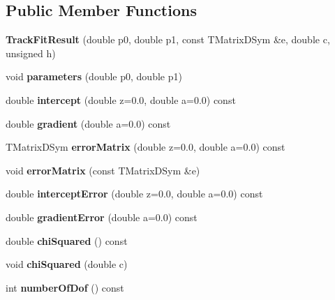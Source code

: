 \subsection*{Public Member Functions}
\begin{DoxyCompactItemize}
\item 
{\bfseries TrackFitResult} (double p0, double p1, const TMatrixDSym \&e, double c, unsigned h)\label{classTBTrack_1_1TrackFitResult_a9be66e8f2f6a85ee13202b35b3e49698}

\item 
void {\bfseries parameters} (double p0, double p1)\label{classTBTrack_1_1TrackFitResult_ad13aa283509c0e7ddca6815ef7a1cc57}

\item 
double {\bfseries intercept} (double z=0.0, double a=0.0) const \label{classTBTrack_1_1TrackFitResult_a7fbbf8ae46fa2ede02b6e9993608bf00}

\item 
double {\bfseries gradient} (double a=0.0) const \label{classTBTrack_1_1TrackFitResult_a4a5441700a888610c735ee01fd13e6d9}

\item 
TMatrixDSym {\bfseries errorMatrix} (double z=0.0, double a=0.0) const \label{classTBTrack_1_1TrackFitResult_a2c0e2dafabfbc64f26dd27497ea2fd75}

\item 
void {\bfseries errorMatrix} (const TMatrixDSym \&e)\label{classTBTrack_1_1TrackFitResult_ae70ea377e10c83a093cfc33680958f14}

\item 
double {\bfseries interceptError} (double z=0.0, double a=0.0) const \label{classTBTrack_1_1TrackFitResult_ae6cb4a2bba4e7f0e3fd18a764b7af88f}

\item 
double {\bfseries gradientError} (double a=0.0) const \label{classTBTrack_1_1TrackFitResult_a41f9c1f909254c6f08c2e755b15fd0c1}

\item 
double {\bfseries chiSquared} () const \label{classTBTrack_1_1TrackFitResult_a6e664b5e02b50c77e7036d0f500f8b86}

\item 
void {\bfseries chiSquared} (double c)\label{classTBTrack_1_1TrackFitResult_a6be030fd4473e6b5f1c49d3818e3449b}

\item 
int {\bfseries numberOfDof} () const \label{classTBTrack_1_1TrackFitResult_a1384e826d2e5e24b8edd6cf5ae3350d9}


\end{DoxyCompactItemize}
